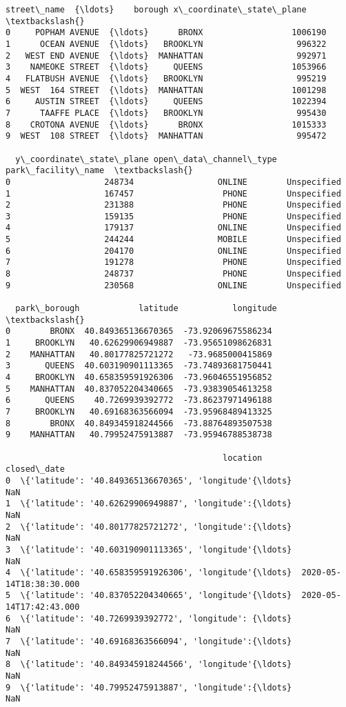 \documentclass[11pt]{article}
\begin{document}
\begin{tcolorbox}[breakable, size=fbox, boxrule=.5pt, pad at break*=1mm, opacityfill=0]
\begin{Verbatim}[commandchars=\\\{\}]
        street\_name  {\ldots}    borough x\_coordinate\_state\_plane  \textbackslash{}
0     POPHAM AVENUE  {\ldots}      BRONX                  1006190
1      OCEAN AVENUE  {\ldots}   BROOKLYN                   996322
2   WEST END AVENUE  {\ldots}  MANHATTAN                   992971
3    NAMEOKE STREET  {\ldots}     QUEENS                  1053966
4   FLATBUSH AVENUE  {\ldots}   BROOKLYN                   995219
5  WEST  164 STREET  {\ldots}  MANHATTAN                  1001298
6     AUSTIN STREET  {\ldots}     QUEENS                  1022394
7      TAAFFE PLACE  {\ldots}   BROOKLYN                   995430
8    CROTONA AVENUE  {\ldots}      BRONX                  1015333
9  WEST  108 STREET  {\ldots}  MANHATTAN                   995472

  y\_coordinate\_state\_plane open\_data\_channel\_type park\_facility\_name  \textbackslash{}
0                   248734                 ONLINE        Unspecified
1                   167457                  PHONE        Unspecified
2                   231388                  PHONE        Unspecified
3                   159135                  PHONE        Unspecified
4                   179137                 ONLINE        Unspecified
5                   244244                 MOBILE        Unspecified
6                   204170                 ONLINE        Unspecified
7                   191278                  PHONE        Unspecified
8                   248737                  PHONE        Unspecified
9                   230568                 ONLINE        Unspecified

  park\_borough            latitude           longitude  \textbackslash{}
0        BRONX  40.849365136670365  -73.92069675586234
1     BROOKLYN   40.62629906949887  -73.95651098626831
2    MANHATTAN   40.80177825721272   -73.9685000415869
3       QUEENS  40.603190901113365  -73.74893681750441
4     BROOKLYN  40.658359591926306  -73.96046551956852
5    MANHATTAN  40.837052204340665  -73.93839054613258
6       QUEENS    40.7269939392772  -73.86237971496188
7     BROOKLYN   40.69168363566094  -73.95968489413325
8        BRONX  40.849345918244566  -73.88764893507538
9    MANHATTAN   40.79952475913887  -73.95946788538738

                                            location              closed\_date
0  \{'latitude': '40.849365136670365', 'longitude'{\ldots}                      NaN
1  \{'latitude': '40.62629906949887', 'longitude':{\ldots}                      NaN
2  \{'latitude': '40.80177825721272', 'longitude':{\ldots}                      NaN
3  \{'latitude': '40.603190901113365', 'longitude'{\ldots}                      NaN
4  \{'latitude': '40.658359591926306', 'longitude'{\ldots}  2020-05-14T18:38:30.000
5  \{'latitude': '40.837052204340665', 'longitude'{\ldots}  2020-05-14T17:42:43.000
6  \{'latitude': '40.7269939392772', 'longitude': {\ldots}                      NaN
7  \{'latitude': '40.69168363566094', 'longitude':{\ldots}                      NaN
8  \{'latitude': '40.849345918244566', 'longitude'{\ldots}                      NaN
9  \{'latitude': '40.79952475913887', 'longitude':{\ldots}                      NaN


\end{Verbatim}
\end{tcolorbox}
\end{document}
